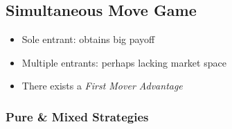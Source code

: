 \documentclass[11pt, english]{article}
\begin{document}
	\newpage

	\subsection{Simultaneous Move Game}

	\begin{itemize}
	\setlength\itemsep{0cm}
		\item Sole entrant: obtains big payoff
		\item Multiple entrants: perhaps lacking market space
		\item There exists a \textit{First Mover Advantage}
	\end{itemize}

		\subsubsection{Pure \& Mixed Strategies}
	
\end{document}
